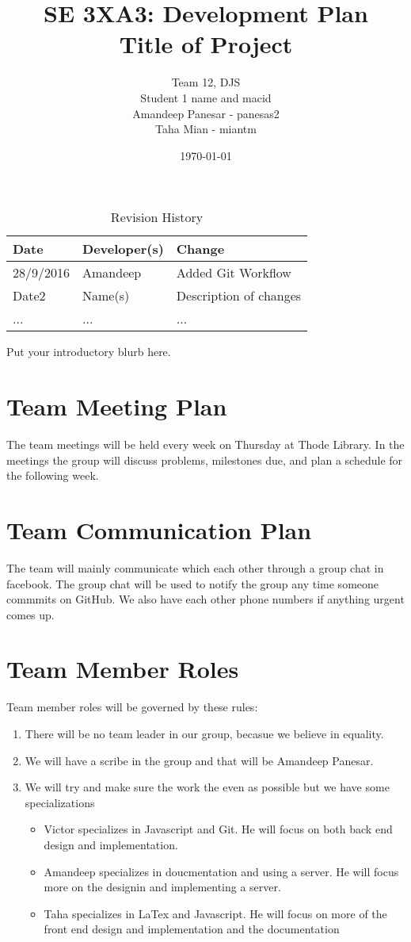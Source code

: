 \documentclass{article}
\title{SE 3XA3: Development Plan\\Title of Project}
\author{Team 12, DJS
		\\ Student 1 name and macid
		\\ Amandeep Panesar - panesas2
		\\ Taha Mian - miantm
}
\date{\today}
\begin{document}
\begin{table}[hp]
\caption{Revision History} \label{TblRevisionHistory}
\begin{tabularx}{\textwidth}{llX}
\toprule
\textbf{Date} & \textbf{Developer(s)} & \textbf{Change}\\
\midrule
28/9/2016 & Amandeep & Added Git Workflow\\
Date2 & Name(s) & Description of changes\\
... & ... & ...\\
\bottomrule
\end{tabularx}
\end{table}

\newpage

\maketitle

Put your introductory blurb here.

\section{Team Meeting Plan}
The team meetings will be held every week on Thursday at Thode Library. In the meetings the group will discuss problems, milestones due, and plan a schedule for the following week.
\section{Team Communication Plan}
The team will mainly communicate which each other through a group chat in facebook. The group chat will be used to notify the group any time someone commmits on GitHub. We also have each other phone numbers if anything urgent comes up.
\section{Team Member Roles}
Team member roles will be governed by these rules:
\begin{enumerate}
\item There will be no team leader in our group, becasue we believe in equality.
\item We will have a scribe in the group and that will be Amandeep Panesar.
\item We will try and make sure the work the even as possible but we have some specializations
\begin{itemize}
\item Victor specializes in Javascript and Git. He will focus on both back end design and implementation.
\item Amandeep specializes in doucmentation and using a server. He will focus more on the designin and implementing a server.
\item Taha specializes in LaTex and Javascript. He will focus on more of the front end design and implementation and the documentation
\end{itemize}
\end{enumerate}
\end{document}
